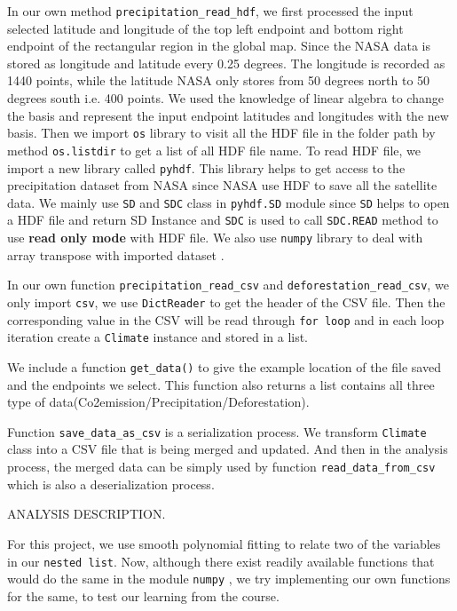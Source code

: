 \documentclass[12pt]{article}
\begin{document}
\begin{enumerate}
\begin{text}
In our own method \texttt{precipitation\_read\_hdf}, we first processed the input selected latitude and longitude of the top left endpoint and bottom right endpoint of the rectangular region in the global map. Since the NASA data is stored as longitude and latitude every 0.25 degrees. The longitude is recorded as 1440 points, while the latitude NASA only stores from 50 degrees north to 50 degrees south i.e. 400 points\citep{N3B43}. We used the knowledge of linear algebra to change the basis and represent the input endpoint latitudes and longitudes with the new basis. 
Then we import \texttt{os} library to visit all the HDF file in the folder path by method \texttt{os.listdir} to get a list of all HDF file name\citep{PytOS}. To read HDF file, we import a new library called \texttt{pyhdf}. This library helps to get access to the precipitation dataset from NASA since NASA use HDF to save all the satellite data. We mainly use \texttt{SD} and \texttt{SDC} class in \texttt{pyhdf.SD} module since \texttt{SD} helps to open a HDF file and return SD Instance and \texttt{SDC} is used to call \texttt{SDC.READ} method to use \textbf{read only mode} with HDF file\citep{Pyhdf}. We also use \texttt{numpy} library to deal with array transpose with imported dataset \citep{Pynpy}.

In our own function \texttt{precipitation\_read\_csv} and \texttt{deforestation\_read\_csv}, we only import \texttt{csv}, we use \texttt{DictReader} to get the header of the CSV file\citep{Pycsv}. Then the corresponding value in the CSV will be read through \texttt{for loop} and in each loop iteration create a \texttt{Climate} instance and stored in a list.

We include a function \texttt{get\_data()} to give the example location of the file saved and the endpoints we select. This function also returns a list contains all three type of data(Co2emission/Precipitation/Deforestation).

Function \texttt{save\_data\_as\_csv} is a serialization process. We transform \texttt{Climate} class into a CSV file that is being merged and updated. And then in the analysis process, the merged data can be simply used by function \texttt{read\_data\_from\_csv} which is also a deserialization process.


ANALYSIS DESCRIPTION.

For this project, we use smooth polynomial fitting to relate two of the variables in our \texttt{nested list}. Now, although there exist readily available functions that would do the same in the module \texttt{numpy} \citep{Sci20}, we try implementing our own functions for the same, to test our learning from the course.


\end{text}
\end{enumerate}
\end{document}
